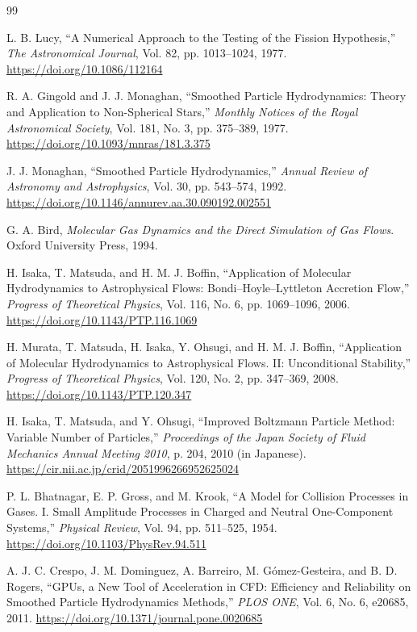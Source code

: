 \documentclass[a4paper,11pt]{ltjsarticle}
\begin{document}
\begin{thebibliography}{99}

L. B. Lucy, ``A Numerical Approach to the Testing of the Fission Hypothesis,''
\textit{The Astronomical Journal}, Vol. 82, pp. 1013--1024, 1977.
\url{https://doi.org/10.1086/112164}

R. A. Gingold and J. J. Monaghan,
``Smoothed Particle Hydrodynamics: Theory and Application to Non-Spherical
Stars,'' \textit{Monthly Notices of the Royal Astronomical Society}, Vol. 181,
No. 3, pp. 375--389, 1977.
\url{https://doi.org/10.1093/mnras/181.3.375}

J. J. Monaghan, ``Smoothed Particle Hydrodynamics,''
\textit{Annual Review of Astronomy and Astrophysics}, Vol. 30, pp. 543--574,
1992.
\url{https://doi.org/10.1146/annurev.aa.30.090192.002551}

G. A. Bird, \textit{Molecular Gas Dynamics and the Direct Simulation of Gas
Flows}. Oxford University Press, 1994.

H. Isaka, T. Matsuda, and H. M. J. Boffin,
``Application of Molecular Hydrodynamics to Astrophysical Flows:
Bondi--Hoyle--Lyttleton Accretion Flow,''
\textit{Progress of Theoretical Physics}, Vol. 116, No. 6, pp. 1069--1096,
2006.
\url{https://doi.org/10.1143/PTP.116.1069}

H. Murata, T. Matsuda, H. Isaka, Y. Ohsugi, and H. M. J. Boffin,
``Application of Molecular Hydrodynamics to Astrophysical Flows. II:
Unconditional Stability,'' \textit{Progress of Theoretical Physics}, Vol. 120,
No. 2, pp. 347--369, 2008.
\url{https://doi.org/10.1143/PTP.120.347}

H. Isaka, T. Matsuda, and Y. Ohsugi,
``Improved Boltzmann Particle Method: Variable Number of Particles,''
\textit{Proceedings of the Japan Society of Fluid Mechanics Annual Meeting
2010}, p. 204, 2010 (in Japanese).
\url{https://cir.nii.ac.jp/crid/2051996266952625024}

P. L. Bhatnagar, E. P. Gross, and M. Krook,
``A Model for Collision Processes in Gases. I. Small Amplitude Processes in
Charged and Neutral One-Component Systems,''
\textit{Physical Review}, Vol. 94, pp. 511--525, 1954.
\url{https://doi.org/10.1103/PhysRev.94.511}

A. J. C. Crespo, J. M. Dominguez, A. Barreiro, M. G\'omez-Gesteira, and
B. D. Rogers, ``GPUs, a New Tool of Acceleration in CFD: Efficiency and
Reliability on Smoothed Particle Hydrodynamics Methods,''
\textit{PLOS ONE}, Vol. 6, No. 6, e20685, 2011.
\url{https://doi.org/10.1371/journal.pone.0020685}


\end{thebibliography}
\end{document}
